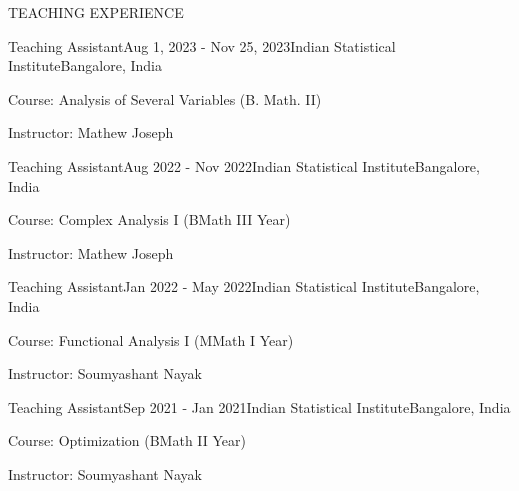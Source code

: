 \documentclass{resume} %
\begin{document}
\begin{rSection}{TEACHING EXPERIENCE}
	
	\begin{rSubsection}{Teaching Assistant}{Aug 1, 2023 - Nov 25, 2023}{Indian Statistical Institute}{Bangalore, India}
		\item Course: Analysis of Several Variables (B. Math. II)
		\item Instructor: Mathew Joseph
	\end{rSubsection}
	
	\begin{rSubsection}{Teaching Assistant}{Aug 2022 - Nov 2022}{Indian Statistical Institute}{Bangalore, India}
		\item Course: Complex Analysis I (BMath III Year)
		\item Instructor: Mathew Joseph
	\end{rSubsection}

	\begin{rSubsection}{Teaching Assistant}{Jan 2022 - May 2022}{Indian Statistical Institute}{Bangalore, India}
		\item Course: Functional Analysis I (MMath I Year)
		\item Instructor: Soumyashant Nayak
	\end{rSubsection}
	
	\begin{rSubsection}{Teaching Assistant}{Sep 2021 - Jan 2021}{Indian Statistical Institute}{Bangalore, India}
		\item Course: Optimization (BMath II Year)
		\item Instructor: Soumyashant Nayak
	\end{rSubsection}

\end{rSection}
\end{document}
